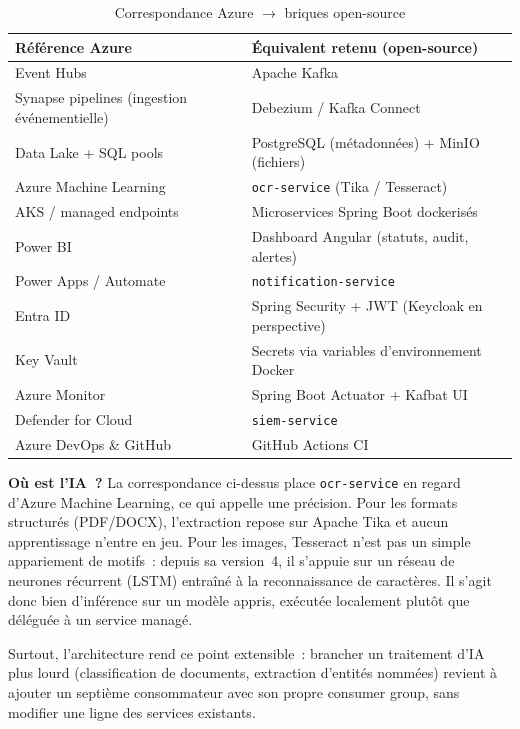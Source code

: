 \documentclass[12pt,a4paper,openany]{report}
\begin{document}
    \begin{table}[H]
    \centering
    \begin{tabularx}{\textwidth}{XX}
    \toprule
    \textbf{R\'ef\'erence Azure} & \textbf{\'Equivalent retenu (open-source)} \\
    \midrule
    Event Hubs & Apache Kafka \\
    Synapse pipelines (ingestion \'ev\'enementielle) & Debezium / Kafka Connect \\
    Data Lake + SQL pools & PostgreSQL (m\'etadonn\'ees) + MinIO (fichiers) \\
    Azure Machine Learning & \texttt{ocr-service} (Tika / Tesseract) \\
    AKS / managed endpoints & Microservices Spring Boot dockeris\'es \\
    Power BI & Dashboard Angular (statuts, audit, alertes) \\
    Power Apps / Automate & \texttt{notification-service} \\
    Entra ID & Spring Security + JWT (Keycloak en perspective) \\
    Key Vault & Secrets via variables d'environnement Docker \\
    Azure Monitor & Spring Boot Actuator + Kafbat UI \\
    Defender for Cloud & \texttt{siem-service} \\
    Azure DevOps \& GitHub & GitHub Actions CI \\
    \bottomrule
    \end{tabularx}
    \caption{Correspondance Azure $\rightarrow$ briques open-source}
    \end{table}

    \begin{notebox}
    \textbf{\og{} O\`u est l'IA~? \fg{}} La correspondance ci-dessus place \texttt{ocr-service} en regard d'Azure Machine Learning, ce qui appelle une pr\'ecision. Pour les formats structur\'es (PDF/DOCX), l'extraction repose sur Apache Tika et aucun apprentissage n'entre en jeu. Pour les images, Tesseract n'est pas un simple appariement de motifs~: depuis sa version~4, il s'appuie sur un r\'eseau de neurones r\'ecurrent (LSTM) entra\^in\'e \`a la reconnaissance de caract\`eres. Il s'agit donc bien d'inf\'erence sur un mod\`ele appris, ex\'ecut\'ee localement plut\^ot que d\'el\'egu\'ee \`a un service manag\'e.

    Surtout, l'architecture rend ce point extensible~: brancher un traitement d'IA plus lourd (classification de documents, extraction d'entit\'es nomm\'ees) revient \`a ajouter un septi\`eme consommateur avec son propre consumer group, sans modifier une ligne des services existants.
    \end{notebox}
\end{document}
